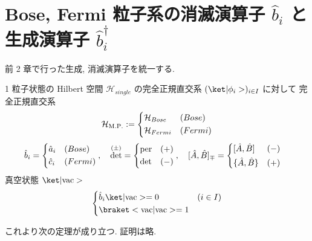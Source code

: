 \documentclass[uplatex,dvipdfmx,a4paper,11pt]{jlreq}
\DeclareMathOperator{\per}{per}
\DeclareMathOperator{\Det}{det}
\newcommand{\HH}{\mathcal{H}}
\numberwithin{equation}{section}
\theoremstyle{definition}
\begin{document}
\section{Bose, Fermi 粒子系の消滅演算子 $\hat{b}_i$ と生成演算子 $\hat{b}_i^\dagger$}
前 2 章で行った生成, 消滅演算子を統一する.
\begin{definition}
  1 粒子状態の Hilbert 空間 $\HH_{single}$ の完全正規直交系 $(\ket|\phi_i>)_{i\in I}$ に対して
  完全正規直交系
  \begin{align}
    \HH_{\mathrm{M.P.}} := \begin{dcases}
                             \HH_{Bose}  & (Bose)  \\
                             \HH_{Fermi} & (Fermi)
                           \end{dcases}
  \end{align}
  \begin{align}
    \hat{b}_i & = \begin{dcases}
                    \hat{a}_i & (Bose)  \\
                    \hat{c}_i & (Fermi)
                  \end{dcases},\quad
    \Det^{(\pm)} = \begin{dcases}
                     \per & (+) \\
                     \Det & (-)
                   \end{dcases},\quad
    [\hat{A}, \hat{B}]_\mp = \begin{dcases}
                               [\hat{A}, \hat{B}]   & (-) \\
                               \{\hat{A}, \hat{B}\} & (+)
                             \end{dcases}
  \end{align}
  真空状態 $\ket|\mathrm{vac}>$
  \begin{align}
    \begin{dcases}
      \hat{b}_i\ket|\mathrm{vac}> = 0 & (i\in I) \\
      \braket<\mathrm{vac}|\mathrm{vac}> = 1
    \end{dcases}
  \end{align}
\end{definition}
これより次の定理が成り立つ. 証明は略.
\end{document}

